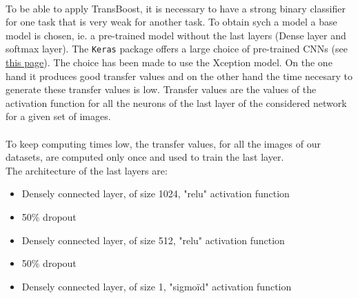 \documentclass[11 pt]{article}
\begin{document}
\paragraph{}To be able to apply TransBoost, it is necessary to have a strong binary classifier for one task that is very weak for another task. To obtain sych a model a base model is chosen, ie. a pre-trained model without the last layers (Dense layer and softmax layer). The \texttt{Keras} package offers a large choice of pre-trained CNNs (see \href{https://keras.io/applications/}{this page}). The choice has been made to use the Xception model. On the one hand it produces good transfer values and on the other hand the time necesary to generate these transfer values is low. Transfer values are the values of the activation function for all the neurons of the last layer of the considered network for a given set of images. 

\paragraph{}To keep computing times low, the transfer values, for all the images of our datasets, are computed only once and used to train the last layer.\\ 

The architecture of the last layers are:
\medskip

\begin{samepage}
  \begin{itemize}
    \item Densely connected layer, of size 1024, "relu" activation function
    \nopagebreak
    \item 50\% dropout 
    \nopagebreak
    \item Densely connected layer, of size 512, "relu" activation function
    \nopagebreak
    \item 50\% dropout 
    \nopagebreak
    \item Densely connected layer, of size 1, "sigmoïd" activation function
  \end{itemize}
\end{samepage}
\end{document}
